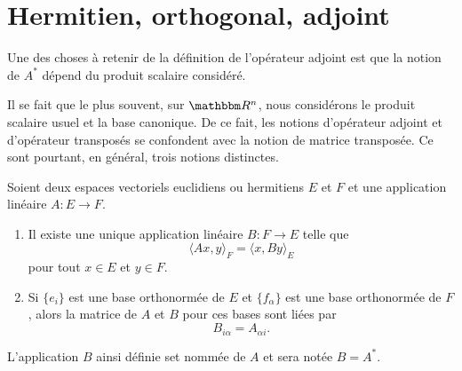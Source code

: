 \section{Hermitien, orthogonal, adjoint}


\begin{normaltext}      \label{NORMooWGEJooCtGtqZ}
    Une des choses à retenir de la définition de l'opérateur adjoint est que la notion de \( A^*\) dépend du produit scalaire considéré.
    
    Il se fait que le plus souvent, sur \( \eR^n\), nous considérons le produit scalaire usuel et la base canonique. De ce fait, les notions d'opérateur adjoint et d'opérateur transposés se confondent avec la notion de matrice transposée. Ce sont pourtant, en général, trois notions distinctes.
\end{normaltext}

\begin{propositionDef}\label{DEFooROVNooFlTbSK}
    Soient deux espaces vectoriels euclidiens ou hermitiens \( E\) et \( F\) et une application linéaire \( A\colon E\to F\).
    \begin{enumerate}
        \item       \label{ITEMooRUZWooSZgGnf}
    Il existe une unique application linéaire \( B\colon F\to E\) telle que
    \begin{equation}        \label{EQooHWYKooFzAGgB}
        \langle Ax, y\rangle_F=\langle x, By\rangle_E
    \end{equation}
    pour tout \( x\in E\) et \( y\in F\).
\item   \label{ITEMooXXEUooPtfPKY}
 Si \( \{ e_i \}\) est une base orthonormée de \( E\) et \( \{ f_{\alpha} \}\) est une base orthonormée de \( F\), alors la matrice de \( A\) et \( B\) pour ces bases sont liées par
 \begin{equation}       \label{EQooUSNVooQtRNGL}
     B_{i\alpha}=A_{\alpha i}.
 \end{equation}
    \end{enumerate}
     L'application \( B\) ainsi définie set nommée  de \( A\) et sera notée \( B=A^*\). 
\end{propositionDef}

